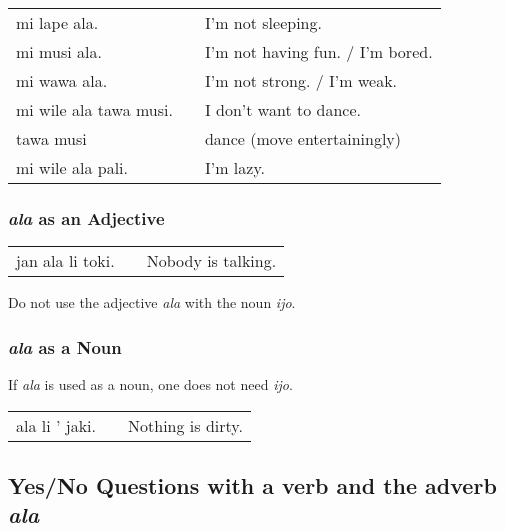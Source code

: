 \begin{supertabular}{p{5,5cm}|ll}
mi lape ala. && I'm not sleeping. \\ 
mi musi ala. && I'm not having fun. / I'm bored. \\
mi wawa ala. && I'm not strong. / I'm weak. \\
mi wile ala tawa musi. && I don't want to dance. \\
tawa musi && dance (move entertainingly) \\
mi wile ala pali. && I'm lazy. \\
\end{supertabular} 

%
\subsubsection*{\textit{ala} as an Adjective}
%
%
\begin{supertabular}{p{5,5cm}|ll}
jan ala li toki. && Nobody is talking. \\
\end{supertabular} 

Do not use the adjective \textit{ala} with the noun \textit{ijo}. 

%
\subsubsection*{\textit{ala} as a Noun}
%
%

If \textit{ala} is used as a noun, one does not need \textit{ijo}.

\begin{supertabular}{p{5,5cm}|ll}
ala li ' jaki. && Nothing is dirty. \\
\end{supertabular} 

%
\subsection*{Yes/No Questions with a verb and the adverb \textit{ala}}
%

